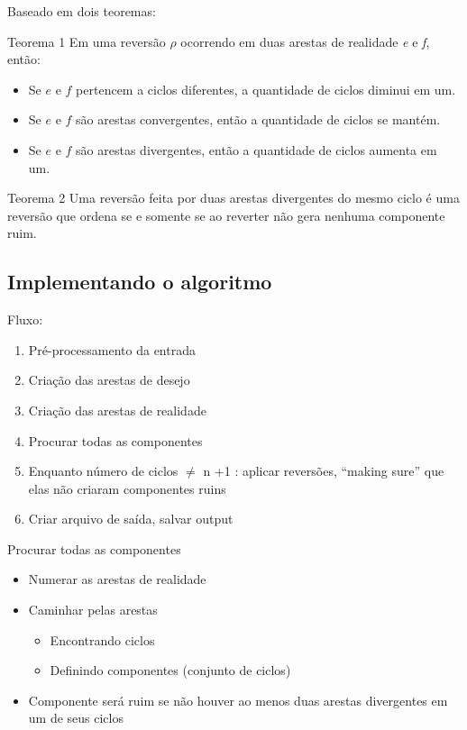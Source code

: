 \documentclass{beamer}
\begin{document}
\begin{frame}
	Baseado em dois teoremas:
	\begin{block} {Teorema 1}
		Em uma reversão $\rho$ ocorrendo em duas arestas de realidade \emph{e} e \emph{f}, então:
		\begin{itemize}
			\item Se $e$ e $f$ pertencem a ciclos diferentes, a quantidade de ciclos diminui em um.
			\item Se $e$ e $f$ são arestas convergentes, então a quantidade de ciclos se mantém.
			\item Se $e$ e $f$ são arestas divergentes, então a quantidade de ciclos aumenta em um.
		\end{itemize}
	\end{block}
	
	\begin{block} {Teorema 2}
		Uma reversão feita por duas arestas divergentes do mesmo ciclo é uma reversão que ordena se e somente se ao reverter não gera nenhuma componente ruim.
	\end{block}
\end{frame}

\subsection{Implementando o algoritmo}

\begin{frame}
	Fluxo:

	\begin{enumerate}
		\item Pré-processamento da entrada
		\item Criação das arestas de desejo
		\item Criação das arestas de realidade
		\item Procurar todas as componentes
		\item Enquanto número de ciclos $\neq$ n +1 :  aplicar reversões, “making sure” que elas não criaram componentes ruins
		\item Criar arquivo de saída, salvar output
	\end{enumerate}
\end{frame}

\begin{frame} {Procurar todas as componentes}
	\begin{itemize}
		\item Numerar as arestas de realidade
  		\item Caminhar pelas arestas
		\begin {itemize}
			\item Encontrando ciclos
 			\item Definindo componentes (conjunto de ciclos)
		\end{itemize}
		\item Componente será ruim se não houver ao menos duas arestas divergentes em um de seus ciclos
	\end{itemize}
\end{frame}
\end{document}
